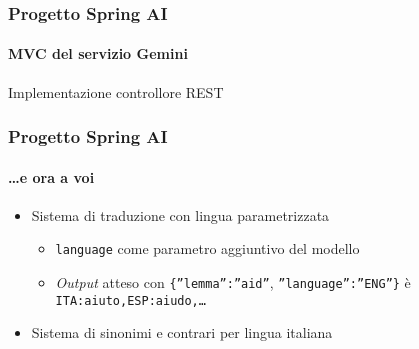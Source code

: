 %
\begin{frame}[t,fragile] \frametitle{Progetto Spring AI}
    \framesubtitle{MVC del servizio Gemini}
    	\vspace*{-.7cm}
        \begin{block}{Implementazione controllore REST}
			{\tiny}
    	\end{block}
\end{frame}
%
\begin{frame}[t,fragile] \frametitle{Progetto Spring AI}
    \framesubtitle{\ldots e ora a voi}
    {\small
        \begin{itemize}[leftmargin=10pt,align=right]
            \item[\alert{\faArrowCircleRight}] Sistema di traduzione con \alert{lingua parametrizzata}
            \begin{itemize}[leftmargin=10pt,align=right]
                \item[\alert{\faArrowCircleRight}] \texttt{language} come parametro aggiuntivo del modello
                \item[\alert{\faArrowCircleRight}] \textit{Output} atteso con \texttt{\{''lemma'':''aid''}, \texttt{''language'':''ENG''\}} è \texttt{ITA:aiuto,ESP:aiudo,\ldots}  
            \end{itemize}
            \item[\alert{\faArrowCircleRight}] Sistema di \alert{sinonimi e contrari} per lingua italiana
        \end{itemize}
    }
\end{frame}
%
